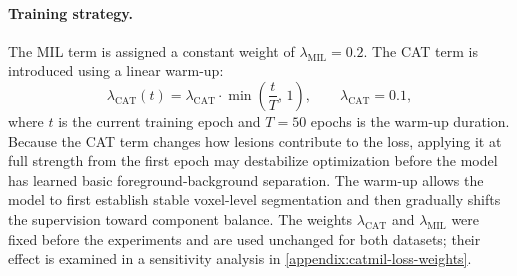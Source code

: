 \paragraph{Training strategy.}
The MIL term is assigned a constant weight of
$\lambda_{\mathrm{MIL}}=0.2$. The CAT term is introduced using a linear
warm-up:
\begin{equation}
\lambda_{\mathrm{CAT}}(t)
=
\lambda_{\mathrm{CAT}} \cdot \min\left(\frac{t}{T},\, 1\right),
\qquad
\lambda_{\mathrm{CAT}} = 0.1 ,
\end{equation}
where $t$ is the current training epoch and $T=50$ epochs is the warm-up
duration. Because the CAT term changes how lesions contribute to the loss,
applying it at full strength from the first epoch may destabilize
optimization before the model has learned basic foreground-background
separation. The warm-up allows the model to first establish stable
voxel-level segmentation and then gradually shifts the supervision toward
component balance. The weights $\lambda_{\mathrm{CAT}}$ and
$\lambda_{\mathrm{MIL}}$ were fixed before the experiments and are used
unchanged for both datasets; their effect is examined in a sensitivity
analysis in \cref{appendix:catmil-loss-weights}.

